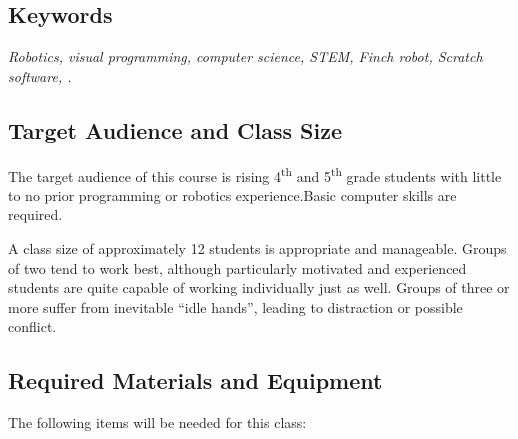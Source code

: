 \documentclass[a4paper]{article}
\begin{document}
	\subsection{Keywords}
	
		\emph{Robotics, visual programming, computer science, STEM, Finch robot, Scratch software, .}
		
	\subsection{Target Audience and Class Size}
	
		The target audience of this course is rising 4\textsuperscript{th} and 5\textsuperscript{th} grade students with little to no prior programming or robotics experience.\footnotemark[3] Basic computer skills are required.\footnotemark[4]
		
		A class size of approximately 12 students is appropriate and manageable. Groups of two tend to work best, although particularly motivated and experienced students are quite capable of working individually just as well. Groups of three or more suffer from inevitable ``idle hands'', leading to distraction or possible conflict.
		
		
		
		
		
		\newpage
		
	\subsection{Required Materials and Equipment}
	
		The following items will be needed for this class:
		
		
\end{document}
